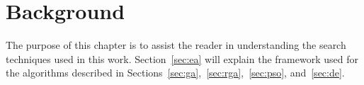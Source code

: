 \chapter{Background}

The purpose of this chapter is to assist the reader in understanding the search techniques used in this work. Section~\ref{sec:ea} will explain the framework used for the algorithms described in Sections~\ref{sec:ga},~\ref{sec:rga},~\ref{sec:pso}, and~\ref{sec:de}.






% 
